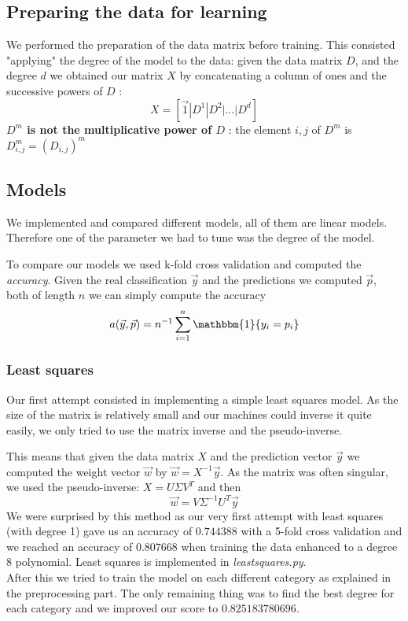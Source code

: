 \documentclass[10pt,conference,compsocconf]{IEEEtran}
\begin{document}
\subsection{Preparing the data for learning}
We performed the preparation of the data matrix before training. This consisted "applying" the degree of the model to the data: given the data matrix $D$, and the degree $d$ we obtained our matrix $X$ by concatenating a column of ones and the successive powers of $D$ : $$X = [\vec{1} | D^1 | D^2 | \dots | D^d]$$
\textbf{$D^m$ is not the multiplicative power of $D$ }: the element $i,j$ of $D^m$ is $D^m_{i,j}= (D_{i,j})^m$

\subsection{Models}
We implemented and compared different models, all of them are linear models. Therefore one of the parameter we had to tune was the degree of the model.

To compare our models we used k-fold cross validation and computed the \textit{accuracy}. Given the real classification $\vec{y}$ and the predictions we computed $\vec{p}$, both of length $n$ we can simply compute the accuracy $$a(\vec{y}, \vec{p}) = n^{-1}\sum_{i=1}^n \mathbbm{1}\{y_i = p_i\}$$

\subsubsection{Least squares}
Our first attempt consisted in implementing a simple least squares model. As the size of the matrix is relatively small and our machines could inverse it quite easily, we only tried to use the matrix inverse and the pseudo-inverse.

This means that given the data matrix $X$ and the prediction vector $\vec{y}$ we computed the weight vector $\vec{w}$ by
$\vec{w} = X^{-1} \vec{y}$. As the matrix was often singular, we used the pseudo-inverse: $X = U \Sigma V^T$ and then
$$\vec{w} = V \Sigma^{-1} U^T \vec{y}$$
We were surprised by this method as our very first attempt with least squares (with degree 1) gave us an accuracy of $0.744388$ with a 5-fold cross validation and we reached an accuracy of $0.807668$ when training the data enhanced to a degree 8 polynomial. 
Least squares is implemented in \textit{leastsquares.py}.\\
After this we tried to train the model on each different category as explained in the preprocessing part. The only remaining thing was to find the best degree for each category and we improved our score to $0.825183780696$. 
\end{document}
